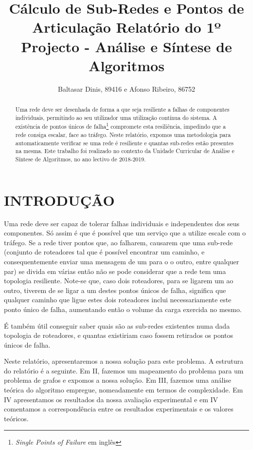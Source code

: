 \documentclass[a4paper, 12pt, conference, portuguese]{ieeeconf}      %
\title{{\LARGE \bf Cálculo de Sub-Redes e Pontos de Articulação}
\large{Relatório do 1º Projecto - Análise e Síntese de Algoritmos}
}
\author{Baltasar Dinis, 89416 e Afonso Ribeiro, 86752}
\begin{document}
\maketitle
\thispagestyle{empty}
\pagestyle{empty}


\begin{abstract}
  Uma rede deve ser desenhada de forma a que seja resiliente a falhas de
  componentes individuais, permitindo ao seu utilizador uma utilização contínua
  do sistema. A existência de pontos únicos de falha\footnote{\textit{Single
  Points of Failure} em inglês} compromete esta resiliência, impedindo que a
  rede consiga escalar, face ao tráfego. Neste relatório, expomos uma
  metodologia para automaticamente verificar se uma rede é resiliente e quantas
  sub-redes estão presentes na mesma. Este trabalho foi realizado no contexto da
  Unidade Curricular de Análise e Síntese de Algoritmos, no ano lectivo de
  2018-2019.
\end{abstract}


\section{INTRODUÇÃO}\label{intro}
Uma rede deve ser capaz de tolerar falhas individuais e independentes dos seus
componentes. Só assim é que é possível que um serviço que a utilize escale com o
tráfego. Se a rede tiver pontos que, ao falharem, causarem que uma sub-rede
(conjunto de roteadores tal que é possível encontrar um caminho, e
consequentemente enviar uma mensagem de um para o o outro, entre qualquer par)
se divida em várias então não se pode considerar que a rede tem uma topologia
resiliente. Note-se que, caso dois roteadores, para se ligarem um ao outro,
tiverem de se ligar a um destes pontos únicos de falha, significa que qualquer
caminho que ligue estes dois roteadores inclui necessariamente este ponto único
de falha, aumentando então o volume da carga exercida no mesmo.

É também útil conseguir saber quais são as sub-redes existentes numa dada
topologia de roteadores, e quantas existiriam caso fossem retirados os pontos
únicos de falha.

Neste relatório, apresentaremos a nossa solução para este problema. A estrutura
do relatório é a seguinte. Em II,
fazemos um mapeamento do problema para um problema de grafos e
expomos a nossa solução. Em III, fazemos uma análise teórica do
algoritmo empregue, nomeadamente em termos de complexidade. Em
IV apresentamos os resultados da nossa avaliação experimental e
em IV comentamos a correspondência entre os resultados
experimentais e os valores teóricos.
\end{document}
